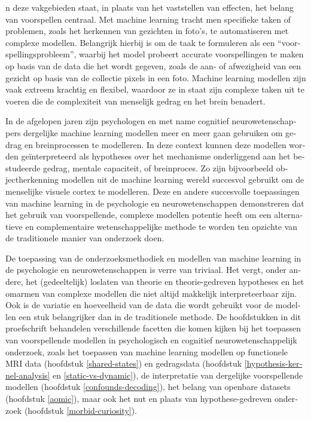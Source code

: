 \documentclass[12pt,american,a4paper,oneside,]{memoir} %
\newenvironment{dutch}[2][]{\begin{otherlanguage}{dutch}}{\end{otherlanguage}}
\begin{document}
\begin{dutch}
In deze vakgebieden staat, in plaats van het vaststellen van effecten, het belang van voorspellen centraal. Met machine learning tracht men specifieke taken of problemen, zoals het herkennen van gezichten in foto's, te automatiseren met complexe modellen. Belangrijk hierbij is om de taak te formuleren als een ``voorspellingsprobleem'', waarbij het model probeert accurate voorspellingen te maken op basis van de data die het wordt gegeven, zoals de aan- of afwezigheid van een gezicht op basis van de collectie pixels in een foto. Machine learning modellen zijn vaak extreem krachtig en flexibel, waardoor ze in staat zijn complexe taken uit te voeren die de complexiteit van menselijk gedrag en het brein benadert.

In de afgelopen jaren zijn psychologen en met name cognitief neurowetenschappers dergelijke machine learning modellen meer en meer gaan gebruiken om gedrag en breinprocessen te modelleren. In deze context kunnen deze modellen worden geïnterpreteerd als hypotheses over het mechanisme onderliggend aan het bestudeerde gedrag, mentale capaciteit, of breinproces. Zo zijn bijvoorbeeld objectherkenning modellen uit de machine learning wereld succesvol gebruikt om de menselijke visuele cortex te modelleren. Deze en andere succesvolle toepassingen van machine learning in de psychologie en neurowetenschappen demonstreren dat het gebruik van voorspellende, complexe modellen potentie heeft om een alternatieve en complementaire wetenschappelijke methode te worden ten opzichte van de traditionele manier van onderzoek doen.

De toepassing van de onderzoeksmethodiek en modellen van machine learning in de psychologie en neurowetenschappen is verre van triviaal. Het vergt, onder andere, het (gedeeltelijk) loslaten van theorie en theorie-gedreven hypotheses en het omarmen van complexe modellen die niet altijd makkelijk interpreteerbaar zijn. Ook is de variatie en hoeveelheid van de data die wordt gebruikt voor de modellen een stuk belangrijker dan in de traditionele methode. De hoofdstukken in dit proefschrift behandelen verschillende facetten die komen kijken bij het toepassen van voorspellende modellen in psychologisch en cognitief neurowetenschappelijk onderzoek, zoals het toepassen van machine learning modellen op functionele MRI data (hoofdstuk \ref{shared-states}) en gedragsdata (hoofdstuk \ref{hypothesis-kernel-analysis} en \ref{static-vs-dynamic}), de interpretatie van dergelijke voorspellende modellen (hoofdstuk \ref{confounds-decoding}), het belang van openbare datasets (hoofdstuk \ref{aomic}), maar ook het nut en plaats van hypothese-gedreven onderzoek (hoofdstuk \ref{morbid-curiosity}).


\end{dutch}
\end{document}
